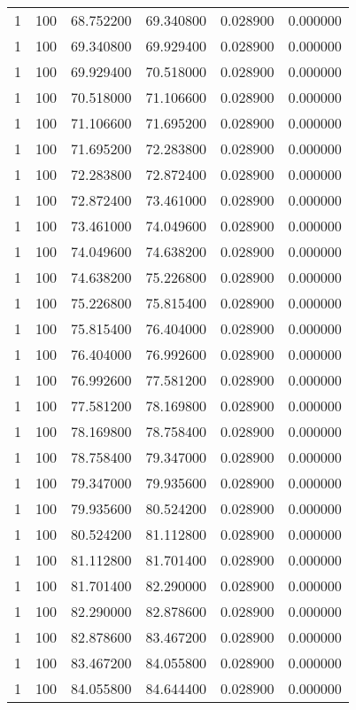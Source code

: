 \begin{longtable}{rrrrrr}
1 & 100 & 68.752200 & 69.340800 & 0.028900 & 0.000000 \\
1 & 100 & 69.340800 & 69.929400 & 0.028900 & 0.000000 \\
1 & 100 & 69.929400 & 70.518000 & 0.028900 & 0.000000 \\
1 & 100 & 70.518000 & 71.106600 & 0.028900 & 0.000000 \\
1 & 100 & 71.106600 & 71.695200 & 0.028900 & 0.000000 \\
1 & 100 & 71.695200 & 72.283800 & 0.028900 & 0.000000 \\
1 & 100 & 72.283800 & 72.872400 & 0.028900 & 0.000000 \\
1 & 100 & 72.872400 & 73.461000 & 0.028900 & 0.000000 \\
1 & 100 & 73.461000 & 74.049600 & 0.028900 & 0.000000 \\
1 & 100 & 74.049600 & 74.638200 & 0.028900 & 0.000000 \\
1 & 100 & 74.638200 & 75.226800 & 0.028900 & 0.000000 \\
1 & 100 & 75.226800 & 75.815400 & 0.028900 & 0.000000 \\
1 & 100 & 75.815400 & 76.404000 & 0.028900 & 0.000000 \\
1 & 100 & 76.404000 & 76.992600 & 0.028900 & 0.000000 \\
1 & 100 & 76.992600 & 77.581200 & 0.028900 & 0.000000 \\
1 & 100 & 77.581200 & 78.169800 & 0.028900 & 0.000000 \\
1 & 100 & 78.169800 & 78.758400 & 0.028900 & 0.000000 \\
1 & 100 & 78.758400 & 79.347000 & 0.028900 & 0.000000 \\
1 & 100 & 79.347000 & 79.935600 & 0.028900 & 0.000000 \\
1 & 100 & 79.935600 & 80.524200 & 0.028900 & 0.000000 \\
1 & 100 & 80.524200 & 81.112800 & 0.028900 & 0.000000 \\
1 & 100 & 81.112800 & 81.701400 & 0.028900 & 0.000000 \\
1 & 100 & 81.701400 & 82.290000 & 0.028900 & 0.000000 \\
1 & 100 & 82.290000 & 82.878600 & 0.028900 & 0.000000 \\
1 & 100 & 82.878600 & 83.467200 & 0.028900 & 0.000000 \\
1 & 100 & 83.467200 & 84.055800 & 0.028900 & 0.000000 \\
1 & 100 & 84.055800 & 84.644400 & 0.028900 & 0.000000 \\

\end{longtable}
